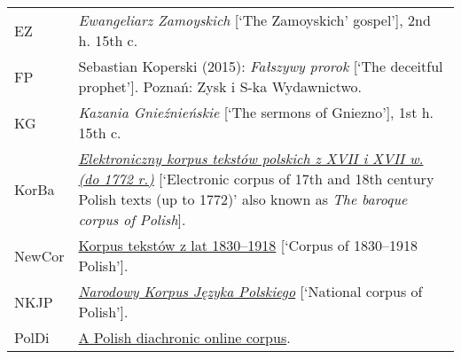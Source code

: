 \documentclass[output=paper]{langsci/langscibook}
\begin{document}
\noindent\begin{tabularx}{\textwidth}{@{}lX@{}}
	EZ & \emph{Ewangeliarz Zamoyskich} [`The Zamoyskich' gospel'], 2nd h. 15th c. \\
	FP & Sebastian Koperski (2015): \emph{Fałszywy prorok} [`The deceitful prophet']. Poznań: Zysk i S-ka Wydawnictwo. \\
	KG &  \emph{Kazania Gnieźnieńskie} [`The sermons of Gniezno'], 1st h. 15th c. \\
	KorBa & \href{http://korba.edu.pl/query_corpus/} {\emph{Elektroniczny korpus tekstów polskich z XVII i XVII w. (do 1772 r.)}} [`Electronic corpus of 17th and 18th century Polish texts (up to 1772)' also known as \textit{The baroque corpus of Polish}]. \\
	NewCor & \href{https://szukajwslownikach.uw.edu.pl/f19/} {Korpus tekstów z lat 1830--1918} [`Corpus of 1830--1918 Polish']. \\
  	NKJP & \href{http://nkjp.pl/} {\emph{Narodowy Korpus Języka Polskiego}} [`National corpus of Polish']. \\
	PolDi & \href{http://rhssl1.uni-regensburg.de/SlavKo/korpus/poldi} {A Polish diachronic online corpus}. \\
\end{tabularx}
\pagebreak

{\sloppy\printbibliography[heading=subbibliography,notkeyword=this]}
\end{document}
